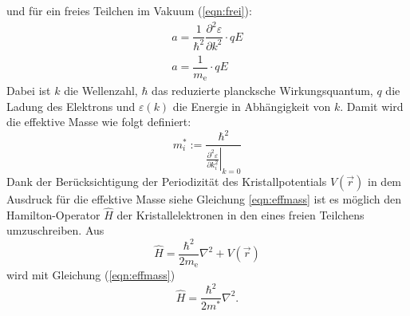  und für ein freies Teilchen im Vakuum (\ref{eqn:frei}):
\begin{align}
  \label{eqn:kris}
  a=\dfrac{1}{\hbar^2}\dfrac{\partial^2 \varepsilon}{\partial k^2}\cdot qE \\
  \label{eqn:frei}
  a=\dfrac{1}{m_\mathrm{e}}\cdot qE
\end{align}
Dabei ist $k$ die Wellenzahl, $\hbar$ das reduzierte plancksche Wirkungsquantum, $q$ die Ladung des Elektrons und $\varepsilon(k)$ die Energie in Abhängigkeit von $k$.
Damit wird die effektive Masse wie folgt definiert:
\begin{equation}
  \label{eqn:effmass}
  m^{*}_i := \frac{\hbar^2}{\left.\frac{\partial^2 \varepsilon}{\partial k_i^2}\right|_{k=0}}
\end{equation}
Dank der Berücksichtigung der Periodizität des Kristallpotentials $V(\vec{r})$ in dem Ausdruck für die effektive Masse siehe Gleichung \ref{eqn:effmass} ist es möglich den Hamilton-Operator $\hat{H}$ der Kristallelektronen in den
eines freien Teilchens umzuschreiben. Aus
\begin{equation*}
  \hat{H}=\dfrac{\hbar^2}{2m_\mathrm{e}}\nabla^2+V(\vec{r})
\end{equation*}
wird mit Gleichung (\ref{eqn:effmass})
\begin{equation*}
  \hat{H}=\dfrac{\hbar^2}{2m^*}\nabla^2 .
\end{equation*}
